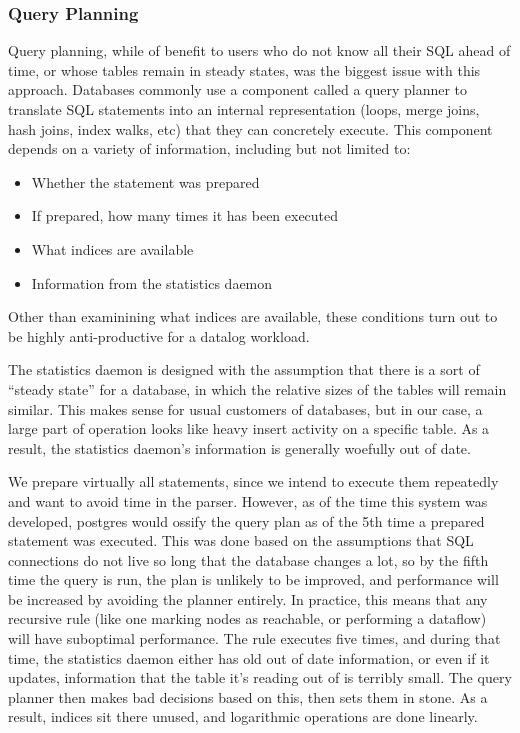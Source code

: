 \subsubsection{Query Planning}
Query planning, while of benefit to users who do not know all their SQL ahead of time, or whose tables remain in steady states, was the biggest issue with this approach.
Databases commonly use a component called a query planner to translate SQL statements into an internal representation (loops, merge joins, hash joins, index walks, etc) that they can concretely execute.
This component depends on a variety of information, including but not limited to:
\begin{itemize}
	\item Whether the statement was prepared
	\item If prepared, how many times it has been executed
	\item What indices are available
	\item Information from the statistics daemon
\end{itemize}
Other than examinining what indices are available, these conditions turn out to be highly anti-productive for a datalog workload.

The statistics daemon is designed with the assumption that there is a sort of ``steady state'' for a database, in which the relative sizes of the tables will remain similar.
This makes sense for usual customers of databases, but in our case, a large part of operation looks like heavy insert activity on a specific table.
As a result, the statistics daemon's information is generally woefully out of date.

We prepare virtually all statements, since we intend to execute them repeatedly and want to avoid time in the parser.
However, as of the time this system was developed, postgres would ossify the query plan as of the 5th time a prepared statement was executed.
This was done based on the assumptions that SQL connections do not live so long that the database changes a lot, so by the fifth time the query is run, the plan is unlikely to be improved, and performance will be increased by avoiding the planner entirely.
In practice, this means that any recursive rule (like one marking nodes as reachable, or performing a dataflow) will have suboptimal performance.
The rule executes five times, and during that time, the statistics daemon either has old out of date information, or even if it updates, information that the table it's reading out of is terribly small.
The query planner then makes bad decisions based on this, then sets them in stone.
As a result, indices sit there unused, and logarithmic operations are done linearly.

